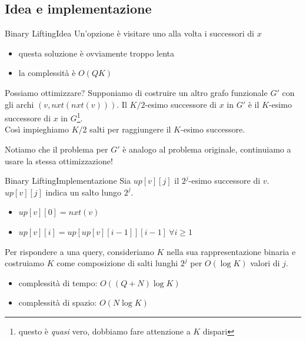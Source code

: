 \documentclass[compress]{beamer}
\begin{document}
\subsection{Idea e implementazione}
\begin{frame}{Binary Lifting}{Idea}
    Un'opzione \`e visitare uno alla volta i successori di $x$
    \pause
    \begin{itemize}
        \item questa soluzione \`e ovviamente troppo lenta
        \item la complessit\`a \`e $O(Q K)$
    \end{itemize}
    \pause
    \vfill
    Possiamo ottimizzare? Supponiamo di costruire un altro grafo funzionale $G'$ con gli archi $(v, nxt(nxt(v)))$. Il $K/2$-esimo successore di $x$ in $G'$ \`e il $K$-esimo successore di $x$ in $G$\footnote{questo \`e \textit{quasi} vero, dobbiamo fare attenzione a $K$ dispari}. \\

    \pause
    \vfill
    Cos\`i impieghiamo $K/2$ salti per raggiungere il $K$-esimo successore.

    \pause
    \vfill
    Notiamo che il problema per $G'$ \`e analogo al problema originale, continuiamo a usare la stessa ottimizzazione!
\end{frame}

\begin{frame}{Binary Lifting}{Implementazione}
    Sia $up[v][j]$ il $2^j$-esimo successore di $v$. $up[v][j]$ indica un salto lungo $2^j$.
    \begin{itemize}
        \item $up[v][0] = nxt(v)$
        \item $up[v][i] = up[up[v][i-1]][i-1] \ \forall i \geq 1$
    \end{itemize}
    \vfill
    \pause
    Per rispondere a una query, consideriamo $K$ nella sua rappresentazione binaria e costruiamo $K$ come composizione di salti lunghi $2^j$ per $O(\log K)$ valori di $j$.
    \vfill
    \begin{itemize}
        \item complessit\`a di tempo: $O((Q + N) \log K)$
        \item complessit\`a di spazio: $O(N \log K)$
    \end{itemize}
\end{frame}
\end{document}
